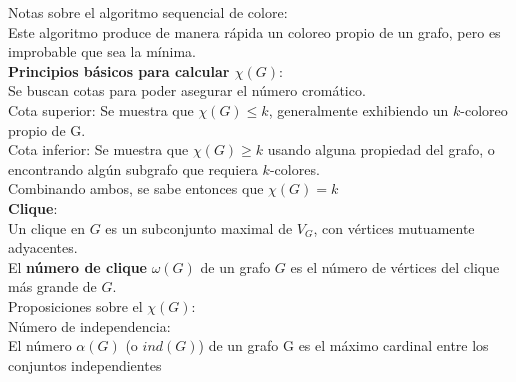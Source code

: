\documentclass[a4paper,11pt]{report}
\begin{document}
Notas sobre el algoritmo sequencial de colore:\\
Este algoritmo produce de manera rápida un coloreo propio de un grafo, pero es improbable que sea la mínima. \\

{\bf Principios básicos para calcular $\chi(G)$}:\\
Se buscan cotas para poder asegurar el número cromático.\\
Cota superior: Se muestra que $\chi(G) \leqslant k$, generalmente exhibiendo un $k$-coloreo propio de G.\\
Cota inferior: Se muestra que $\chi(G) \geqslant k$ usando alguna propiedad del grafo, o encontrando algún subgrafo que requiera $k$-colores.\\
Combinando ambos, se sabe entonces que $\chi(G)=k$\\

{\bf Clique}:\\
Un clique en $G$ es un subconjunto maximal de $V_G$, con vértices mutuamente adyacentes.\\
El {\bf número de clique} $\omega(G)$ de un grafo $G$ es el número de vértices del clique más grande de $G$.\\
Proposiciones sobre el $\chi(G)$:\\

Número de independencia: \\
El número $\alpha(G)$ (o $ind(G)$) de un grafo G es el máximo cardinal entre los conjuntos independientes
\end{document}
